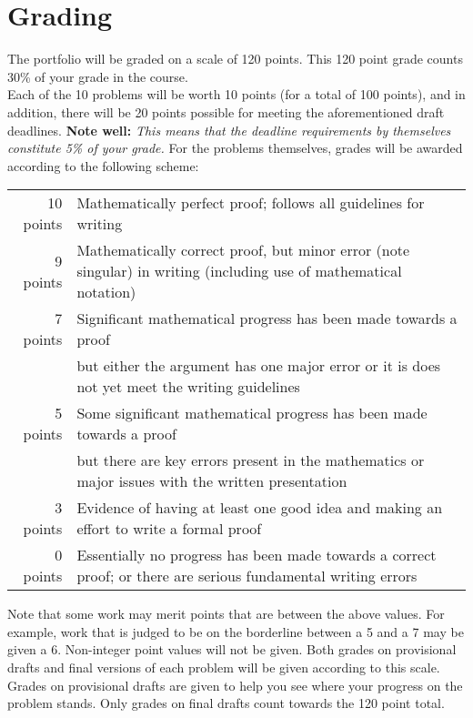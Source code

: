 \documentclass[11pt]{article}
\begin{document}
\section*{Grading}

\noindent The portfolio will be graded on a scale of 120 points.  This 120 point grade counts 30\% of your grade in the course.  
 \\

\noindent Each of the 10 problems will be worth 10 points (for a total of 100 points), and in addition, there will be 20 points possible for meeting the aforementioned draft deadlines. \textbf{Note well:} \emph{This means that the deadline requirements by themselves constitute 5\% of your grade. }For the problems themselves, grades will be awarded according to the following scheme:

\bigskip

\begin{tabular}{r p{5in}}
10 points  &  Mathematically perfect proof; follows all guidelines for writing\\

9 points &  Mathematically correct proof, but minor error (note singular) in writing  (including use of mathematical notation)\\

7 points &  Significant mathematical progress has been made towards a proof\\
& but either the argument has one major error or it is does not yet meet the writing guidelines \\

5 points &  Some significant mathematical progress has been made towards a proof \\ & but there are key errors present in the mathematics or major issues with the written presentation \\

3 points & Evidence of having at least one good idea 
and making an effort to write a formal proof\\

0 points &  Essentially no progress has been made towards a
correct proof; or there are serious fundamental writing errors\\

\end{tabular}

Note that some work may merit points that are between the above values. For example, work that is judged to be on the borderline between a 5 and a 7 may be given a 6. Non-integer point values will not be given. Both grades on provisional drafts and final versions of each problem will be given according to this scale.  Grades on provisional drafts are given to help you see where your progress on the problem stands.  Only grades on final drafts count towards the 120 point total. \\
\end{document}
